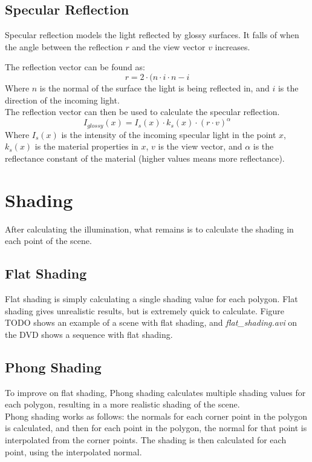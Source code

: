 \documentclass[a4paper,11pt]{article}
\begin{document}
\subsection{Specular Reflection}
Specular reflection models the light reflected by glossy surfaces. It falls of when the angle between the reflection $r$ and the view vector $v$ increases.

The reflection vector can be found as:
\[r=2 \cdot (n \cdot i \cdot n - i\]
Where $n$ is the normal of the surface the light is being reflected in, and $i$ is the direction of the incoming light.\\

The reflection vector can then be used to calculate the specular reflection.
\[I_{glossy}(x)=I_s(x) \cdot k_s(x) \cdot (r \cdot v)^\alpha\]
Where $I_s(x)$ is the intensity of the incoming specular light in the point $x$, $k_s(x)$ is the material properties in $x$, $v$ is the view vector, and $\alpha$ is the reflectance constant of the material (higher values means more reflectance).
\section{Shading}
After calculating the illumination, what remains is to calculate the shading in each point of the scene.
\subsection{Flat Shading}
Flat shading is simply calculating a single shading value for each polygon. Flat shading gives unrealistic results, but is extremely quick to calculate. Figure TODO shows an example of a scene with flat shading, and \emph{flat\_shading.avi} on the DVD shows a sequence with flat shading. 

\subsection{Phong Shading}
To improve on flat shading, Phong shading calculates multiple shading values for each polygon, resulting in a more realistic shading of the scene.\\

Phong shading works as follows: the normals for each corner point in the polygon is calculated, and then for each point in the polygon, the normal for that point is interpolated from the corner points. The shading is then calculated for each point, using the interpolated normal.\\
\end{document}
